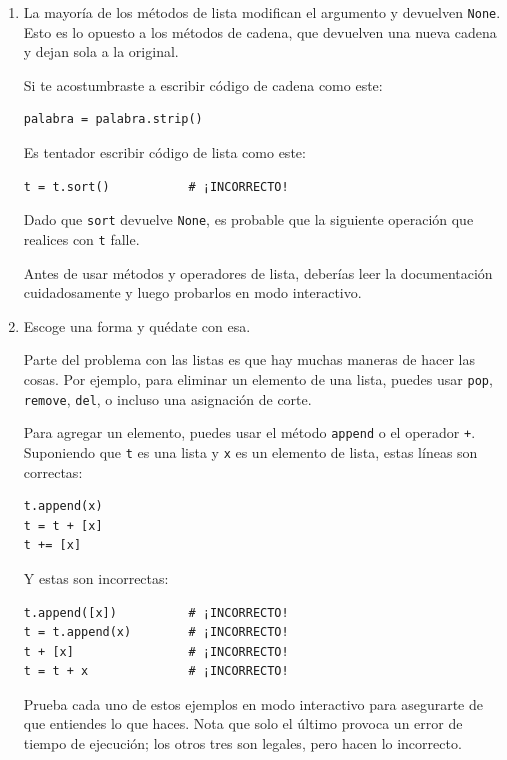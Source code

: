 \documentclass[10pt]{book}
\begin{document}
\begin{enumerate}

\item La mayoría de los métodos de lista modifican el argumento y
  devuelven {\tt None}.  Esto es lo opuesto a los métodos de cadena,
  que devuelven una nueva cadena y dejan sola a la original.

Si te acostumbraste a escribir código de cadena como este:

\begin{verbatim}
palabra = palabra.strip()
\end{verbatim}

Es tentador escribir código de lista como este:

\begin{verbatim}
t = t.sort()           # ¡INCORRECTO!
\end{verbatim}

Dado que {\tt sort} devuelve {\tt None}, es probable que la
siguiente operación que realices con {\tt t} falle.

Antes de usar métodos y operadores de lista, deberías leer la
documentación cuidadosamente y luego probarlos en modo interactivo.

\item Escoge una forma y quédate con esa.

Parte del problema con las listas es que hay muchas
maneras de hacer las cosas.  Por ejemplo, para eliminar un elemento de
una lista, puedes usar {\tt pop}, {\tt remove}, {\tt del},
o incluso una asignación de corte.

Para agregar un elemento, puedes usar el método {\tt append} o
el operador {\tt +}.  Suponiendo que {\tt t} es una lista y
{\tt x} es un elemento de lista, estas líneas son correctas:

\begin{verbatim}
t.append(x)
t = t + [x]
t += [x]
\end{verbatim}

Y estas son incorrectas:

\begin{verbatim}
t.append([x])          # ¡INCORRECTO!
t = t.append(x)        # ¡INCORRECTO!
t + [x]                # ¡INCORRECTO!
t = t + x              # ¡INCORRECTO!
\end{verbatim}

Prueba cada uno de estos ejemplos en modo interactivo para asegurarte
de que entiendes lo que haces.  Nota que solo el último
provoca un error de tiempo de ejecución; los otros tres son legales, pero
hacen lo incorrecto.



\end{enumerate}
\end{document}
